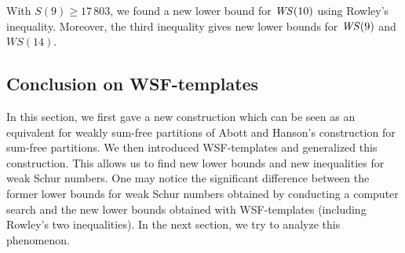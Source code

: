 \resetarraystretch

With \( S(9) \geqslant 17\,803 \), we found a new lower bound for \(\mathit{WS}(10)\) using Rowley's inequality.
Moreover, the third inequality gives new lower bounds for \(\mathit{WS}(9)\) and \(WS(14)\).


\subsection{Conclusion on WSF-templates}

\qquad In this section, we first gave a new construction which can be seen as an equivalent for weakly sum-free partitions of Abott
and Hanson's construction for sum-free partitions. We then  introduced WSF-templates and generalized this construction. This
allows us to find new lower bounds and new inequalities for weak Schur numbers. One may notice the significant difference
between the former lower bounds for weak Schur numbers obtained by conducting a computer search and the new lower bounds
obtained with WSF-templates (including Rowley's two inequalities). In the next section, we try to analyze this phenomenon.
